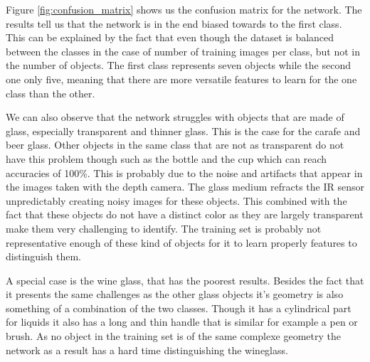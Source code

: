 Figure \ref{fig:confusion_matrix} shows us the confusion matrix for the network. The results tell us that the network is in the end biased towards to the first class. This can be explained by the fact that even though the dataset is balanced between the classes in the case of number of training images per class, but not in the number of objects. The first class represents seven objects while the second one only five, meaning that there are more versatile features to learn for the one class than the other.

We can also observe that the network struggles with objects that are made of glass, especially transparent and thinner glass. This is the case for the carafe and beer glass. Other objects in the same class that are not as transparent do not have this problem though such as the bottle and the cup which can reach accuracies of 100\%. This is probably due to the noise and artifacts that appear in the images taken with the depth camera. The glass medium refracts the IR sensor unpredictably creating noisy images for these objects. This combined with the fact that these objects do not have a distinct color as they are largely transparent make them very challenging to identify. The training set is probably not representative enough of these kind of objects for it to learn properly features to distinguish them.

A special case is the wine glass, that has the poorest results. Besides the fact that it presents the same challenges as the other glass objects it's geometry is also something of a combination of the two classes. Though it has a cylindrical part for liquids it also has a long and thin handle that is similar for example a pen or brush. As no object in the training set is of the same complexe geometry the network as a result has a hard time distinguishing the wineglass.
